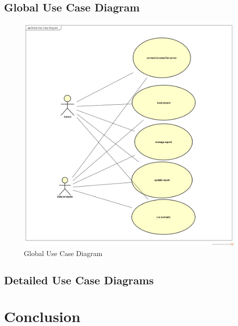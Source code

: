 \documentclass[12pt]{article}
\begin{document}
	\subsection{Global Use Case Diagram}
	\clearpage
	\newpage
	\begin{figure}[h]
		\centering
		\includegraphics[width=1.0\textwidth]{GlobalUseCaseDiagram.png}
		\caption{Global Use Case Diagram}
		
	\end{figure}

\clearpage
\newpage


	\subsection{Detailed Use Case Diagrams}
	
	
	\clearpage
	\newpage
	
	\section{Conclusion}
	
\end{document}
